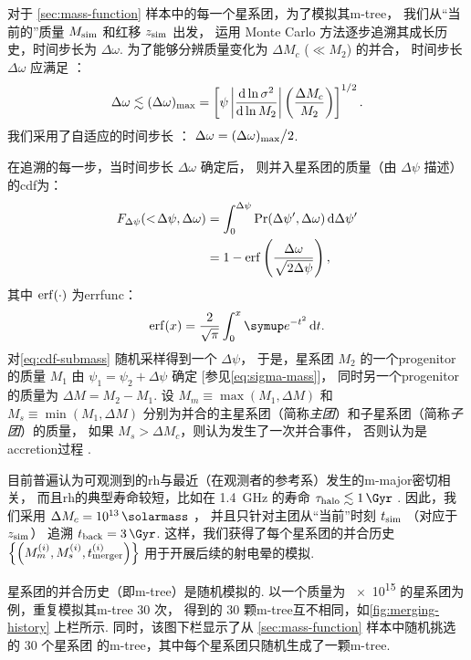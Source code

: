对于 \autoref{sec:mass-function} 样本中的每一个星系团，为了模拟其\ac{m-tree}，
我们从\enquote{当前的}质量 $M_{\mathrm{sim}}$ 和红移 $z_{\mathrm{sim}}$ 出发，
运用 Monte Carlo 方法逐步追溯其成长历史，时间步长为 $\Delta\omega$.
为了能够分辨质量变化为 $\Delta M_c$ ($\ll M_2$) 的并合，
时间步长 $\Delta\omega$ 应满足 \cite{lacey1993}：
\begin{equation}
  \Delta\omega \lesssim (\Delta\omega)_{\mathrm{max}} =
    \left[ \psi \left| \frac{\mathrm{d}\ln \sigma^2}{\mathrm{d}\ln M_2} \right|
      \left( \frac{\Delta M_c}{M_2} \right) \right]^{1/2} .
\end{equation}
我们采用了自适应的时间步长 \cite{randall2002}：
$\Delta\omega = (\Delta\omega)_{\mathrm{max}} \big/ 2$.

在追溯的每一步，当时间步长 $\Delta\omega$ 确定后，
则并入星系团的质量（由 $\Delta\psi$ 描述）的\ac{cdf}为：
\begin{align}
  F_{\Delta\psi}(<\!\Delta\psi, \Delta\omega)
    & = \int_0^{\Delta\psi} \mathrm{Pr}(\Delta\psi', \Delta\omega)
      \,\mathrm{d}\Delta\psi' \\
    & = 1 - \operatorname{erf} \left( \frac{\Delta\omega}{\sqrt{2\Delta\psi}} \right) ,
  \label{eq:cdf-submass}
\end{align}
其中 $\operatorname{erf}(\cdot)$ 为\ac{errfunc}：
\begin{equation}
  \erf(x) = \frac{2}{\sqrt{\pi}} \int_0^x \Ce^{-t^2} \,\D{t} .
\end{equation}
对\autoref{eq:cdf-submass} 随机采样得到一个 $\Delta\psi$，
于是，星系团 $M_2$ 的一个\ac{progenitor}的质量 $M_1$
由 $\psi_1 = \psi_2 + \Delta\psi$ 确定 [参见\autoref{eq:sigma-mass}]，
同时另一个\ac{progenitor}的质量为 $\Delta M = M_2 - M_1$.
设 $M_m \equiv \max(M_1, \Delta M)$ 和 $M_s \equiv \min(M_1, \Delta M)$
分别为并合的主星系团（简称\emph{主团}）和子星系团（简称\emph{子团}）的质量，
如果 $M_s > \Delta M_c$，则认为发生了一次并合事件，
否则认为是\ac{accretion}过程 \cite{randall2002}.

目前普遍认为可观测到的\ac{rh}与最近（在观测者的参考系）发生的\ac{m-major}密切相关，
而且\ac{rh}的典型寿命较短，比如在 \SI{1.4}{\GHz} 的寿命
$\tau_{\R{halo}} \lesssim \SI{1}{\Gyr}$ \cite{brunetti2009,cassano2016}.
因此，我们采用 $\Delta M_c = \SI{e13}{\solarmass}$ \cite{cassano2005}，
并且只针对主团从\enquote{当前}时刻 $t_{\mathrm{sim}}$ （对应于 $z_{\mathrm{sim}}$）
追溯 $t_{\R{back}} = \SI{3}{\Gyr}$.
这样，我们获得了每个星系团的并合历史
$\left\{\left( M_m^{(i)}, M_s^{(i)}, t_{\mathrm{merger}}^{(i)} \right)\right\}$
用于开展后续的射电晕的模拟.

星系团的并合历史（即\ac{m-tree}）是随机模拟的.
以一个质量为 \SI{e15}{\solarmass} 的星系团为例，重复模拟其\ac{m-tree} 30 次，
得到的 30 颗\ac{m-tree}互不相同，如\autoref{fig:merging-history} 上栏所示.
同时，该图下栏显示了从 \autoref{sec:mass-function} 样本中随机挑选的 30 个星系团
的\ac{m-tree}，其中每个星系团只随机生成了一颗\ac{m-tree}.

